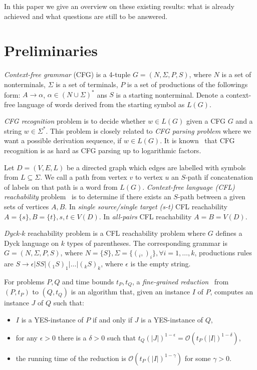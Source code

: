\documentclass[acmsmall,nonacm]{acmart}
\begin{document}
	In this paper we give an overview on these existing results: what is already achieved and what questions are still to be answered.
	
	\section{Preliminaries}
	
	\emph{Context-free grammar} (CFG) is a 4-tuple $G=(N, \Sigma, P, S)$, where $N$ is a set of nonterminals, $\Sigma$ is a set of terminals, $P$ is a set of productions of the followings form: $A \to \alpha$, $\alpha \in (N \cup \Sigma)^*$ ans $S$ is a starting nonterminal. Denote a context-free language of words derived from the starting symbol as $L(G)$.
	
	\emph{CFG recognition} problem is to decide whether $w \in L(G)$ given a CFG $G$ and a string $w \in \Sigma^*$. This problem is closely related to \emph{CFG parsing problem} where we want a possible derivation sequence, if $w \in L(G)$. It is known~\cite{10.5555/646233.682379} that CFG recognition is as hard as CFG parsing up to logarithmic factors.
	
	Let $D = (V, E, L)$ be a directed graph which edges are labelled with symbols from $L \subseteq \Sigma$. We call a path from vertex $v$ to vertex $u$ an $S$-path if concatenation of labels on that path is a word from $L(G)$.  \emph{Context-free language (CFL) reachability} problem~\cite{REPS1998701} is to determine if there exists an $S$-path between a given sets of vertices $A, B$. In \emph{single source/single target (s-t)} CFL reachability $A = \{s\}, B = \{t\}, s, t \in V(D)$. In \emph{all-pairs} CFL reachability $A = B = V(D)$.
	
	\emph{Dyck-$k$} reachability problem is a CFL reachability problem where $G$ defines a Dyck language on $k$ types of parentheses. The corresponding grammar is $G=(N, \Sigma, P, S)$, where $N = \{S\}, \Sigma = \{(_i, )_i\}, \forall i = 1, \ldots, k$, productions rules are $S \rightarrow \epsilon | SS | (_1 S )_1 | \ldots | (_k S )_k$, where $\epsilon$ is the empty string. 
	
	For problems $P, Q$ and time bounds $t_P, t_Q$, a \emph{fine-grained reduction}~\cite{bringmann2019fine} from $(P, t_P)$ to $(Q, t_Q)$ is an algorithm that, given an instance $I$ of $P$, computes an instance $J$ of $Q$ such that: 
	
	\begin{itemize}
		\item $I$ is a YES-instance of $P$ if and only if $J$ is a YES-instance of $Q$,
		\item for any $\epsilon > 0$ there is a $\delta > 0$ such that $t_Q(|J|)^{1 - \epsilon} = \mathcal{O}(t_P (|I|)^{1 - \delta})$, 
		\item the running time of the reduction is $\mathcal{O}(t_P (|I|)^{1 - \gamma})$ for some $\gamma > 0$.
	\end{itemize}
	
\end{document}
